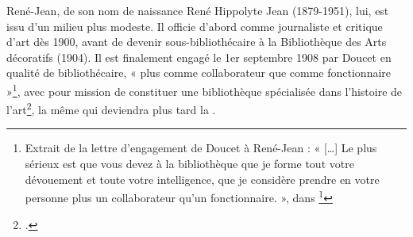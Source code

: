 René-Jean, de son nom de naissance René Hippolyte Jean (1879-1951), lui, est issu d’un milieu plus modeste. Il officie d’abord comme journaliste et critique d’art dès 1900, avant de devenir sous-bibliothécaire à la Bibliothèque des Arts décoratifs (1904). Il est finalement engagé le 1er septembre 1908 par Doucet en qualité de bibliothécaire, « plus comme collaborateur que comme fonctionnaire »\footnote{Extrait de la lettre d’engagement de Doucet à René-Jean : « […] Le plus sérieux est que vous devez à la bibliothèque que je forme tout votre dévouement et toute votre intelligence, que je considère prendre en votre personne plus un collaborateur qu’un fonctionnaire. », dans \footcite[p.139]{chapon_cetait_2006}}, avec pour mission de constituer une bibliothèque spécialisée dans l’histoire de l’art\footcite{sarda_rene-jean_2021}, la même qui deviendra plus tard la \baa. 
